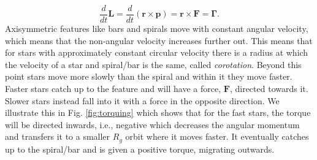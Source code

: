 \begin{equation}
    \frac{d}{dt}\pmb{L} = \frac{d}{dt}(\pmb{r}\times\pmb{p}) = \pmb{r}\times\pmb{F} = \pmb{\Gamma}.
\end{equation}
Axisymmetric features like bars and spirals move with constant angular velocity, which means that the non-angular velocity increases further out. This means that for stars with approximately constant circular velocity there is a radius at which the velocity of a star and spiral/bar is the same, called \textit{corotation}. Beyond this point stars move more slowly than the spiral and within it they move faster. Faster stars catch up to the feature and will have a force, $\pmb{F}$, directed towards it. Slower stars instead fall into it with a force in the opposite direction. We illustrate this in Fig. \ref{fig:torquing} which shows that for the fast stars, the torque will be directed inwards, i.e., negative which decreases the angular momentum and transfers it to a smaller $R_g$ orbit where it moves faster. It eventually catches up to the spiral/bar and is given a positive torque, migrating outwards. 